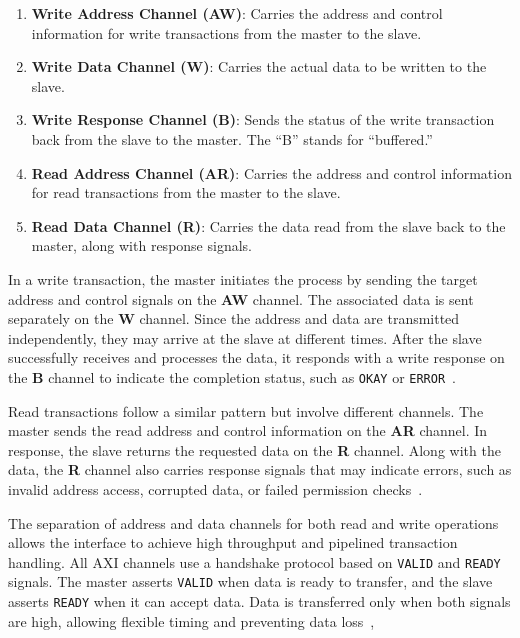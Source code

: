 \begin{enumerate}
    \item \textbf{Write Address Channel (AW)}: Carries the address and control information for write transactions from the master to the slave.
    \item \textbf{Write Data Channel (W)}: Carries the actual data to be written to the slave.
    \item \textbf{Write Response Channel (B)}: Sends the status of the write transaction back from the slave to the master. The “B” stands for “buffered.”
    \item \textbf{Read Address Channel (AR)}: Carries the address and control information for read transactions from the master to the slave.
    \item \textbf{Read Data Channel (R)}: Carries the data read from the slave back to the master, along with response signals.
\end{enumerate}

In a write transaction, the master initiates the process by sending the target address and control signals on the \textbf{AW} channel. The associated data is sent separately on the \textbf{W} channel. Since the address and data are transmitted independently, they may arrive at the slave at different times. After the slave successfully receives and processes the data, it responds with a write response on the \textbf{B} channel to indicate the completion status, such as \texttt{OKAY} or \texttt{ERROR}~\cite{arm_ltd_introduction_2020}.

Read transactions follow a similar pattern but involve different channels. The master sends the read address and control information on the \textbf{AR} channel. In response, the slave returns the requested data on the \textbf{R} channel. Along with the data, the \textbf{R} channel also carries response signals that may indicate errors, such as invalid address access, corrupted data, or failed permission checks~\cite{arm_ltd_introduction_2020}.

The separation of address and data channels for both read and write operations allows the interface to achieve high throughput and pipelined transaction handling. 
All AXI channels use a handshake protocol based on \texttt{VALID} and \texttt{READY} signals. The master asserts \texttt{VALID} when data is ready to transfer, and the slave asserts \texttt{READY} when it can accept data. Data is transferred only when both signals are high, allowing flexible timing and preventing data loss~\cite{arm_ltd_introduction_2020},
\fi

